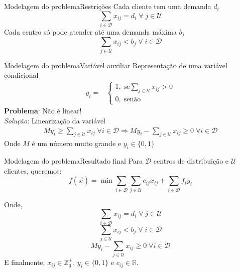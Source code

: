 \documentclass{beamer}
\begin{document}
\begin{frame}{Modelagem do problema}{Restrições}
    Cada cliente tem uma demanda $d_i$
    \begin{equation*}
        \sum_{i\in\mathcal{D}}x_{ij}=d_i \;\forall\;j\in\mathcal{U}
    \end{equation*}
    Cada centro só pode atender até uma demanda máxima $b_j$     
    \begin{equation*}
        \sum_{j\in\mathcal{U}} x_{ij}<b_j \;\forall\; i\in\mathcal{D}
    \end{equation*}
\end{frame}

\begin{frame}{Modelagem do problema}{Variável auxiliar}
    Representação de uma variável condicional
    \begin{align*}
        y_i = & \begin{cases}
            1,\;\text{se} \sum_{j\in\mathcal{U}}x_{ij}>0\\
            0,\;\text{senão}
        \end{cases}
    \end{align*}
    \textbf{Problema}: Não é linear!\\
    \vspace{12pt}
    \textit{Solução}: Linearização da variável
    \begin{align*}
        My_i\ge\sum_{j\in\mathcal{U}}x_{ij}\;\forall i \in \mathcal{D} \Longrightarrow  My_i - \sum_{j\in\mathcal{U}}x_{ij}\ge0\;\forall i \in \mathcal{D}
    \end{align*}
    Onde $M$ é um número muito grande e $y_i\in\{0,1\}$
\end{frame}


\begin{frame}{Modelagem do problema}{Resultado final}
    Para $\mathcal{D}$ centros de distribuição e $\mathcal{U}$ clientes, queremos:
    \begin{equation*}
        f(\vec{x})=\min\sum_{i\in\mathcal{D}}\sum_{j\in\mathcal{U}}c_{ij}x_{ij} + \sum_{i\in\mathcal{D}}f_iy_i
    \end{equation*}

    Onde,
    \begin{equation*}
        \sum_{i\in\mathcal{D}}x_{ij}=d_i \;\forall\;j\in\mathcal{U}
    \end{equation*}
    \begin{equation*}
        \sum_{j\in\mathcal{U}} x_{ij}<b_j \;\forall\; i\in\mathcal{D}
    \end{equation*}
    \begin{equation*}
        My_i - \sum_{j\in\mathcal{U}}x_{ij}\ge0\;\forall i \in \mathcal{D}    
    \end{equation*}
    E finalmente, $x_{ij}\in\mathbb{Z}^{+}_{0}$, $y_i\in\{0,1\}$ e $c_{ij}\in\mathbb{R}$.
\end{frame}
\end{document}
